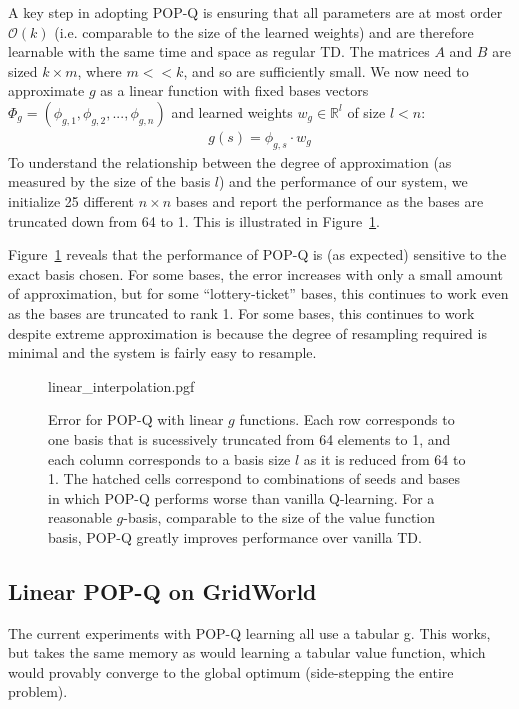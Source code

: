 A key step in adopting POP-Q is ensuring that all parameters are at most order $\mathcal O(k)$ (i.e. comparable to the size of the learned weights) and are therefore learnable with the same time and space as regular TD. The matrices $A$ and $B$ are sized $k\times m$, where $m << k$, and so are sufficiently small. We now need to approximate $g$ as a linear function with fixed bases vectors $\Phi_g = (\phi_{g,1}, \phi_{g,2}, ..., \phi_{g,n})$ and learned weights $w_g \in \mathbb R^{l}$ of size $l < n$:
\begin{align}
  g(s) = \phi_{g, s} \cdot w_g
\end{align}
To understand the relationship between the degree of approximation (as measured by the size of the basis $l$) and the performance of our system, we initialize 25 different $n\times n$ bases and report the performance as the bases are truncated down from 64 to 1. This is illustrated in Figure~\ref{fig:linearerr}.

Figure~\ref{fig:linearerr} reveals that the performance of POP-Q is (as expected) sensitive to the exact basis chosen. For some bases, the error increases with only a small amount of approximation, but for some ``lottery-ticket'' bases, this continues to work even as the bases are truncated to rank 1. For some bases, this continues to work despite  extreme approximation is because the degree of resampling required is minimal and the system is fairly easy to resample.


\label{sec:explinearoffpolicy}
\begin{figure}[t]
  \centering
  {linear_interpolation.pgf}
  \caption{Error for POP-Q with linear $g$ functions. Each row corresponds to one basis that is sucessively truncated from 64 elements to 1, and each column corresponds to a basis size $l$ as it is reduced from 64 to 1. The hatched cells correspond to combinations of seeds and bases in which POP-Q performs worse than vanilla Q-learning. For a reasonable $g$-basis, comparable to the size of the value function basis, POP-Q greatly improves performance over vanilla TD. }
  \label{fig:linearerr}
\end{figure}


\subsection{Linear POP-Q on GridWorld}

The current experiments with POP-Q learning all use a tabular g. This works, but takes the same memory as would learning a tabular value function, which would provably converge to the global optimum (side-stepping the entire problem).

